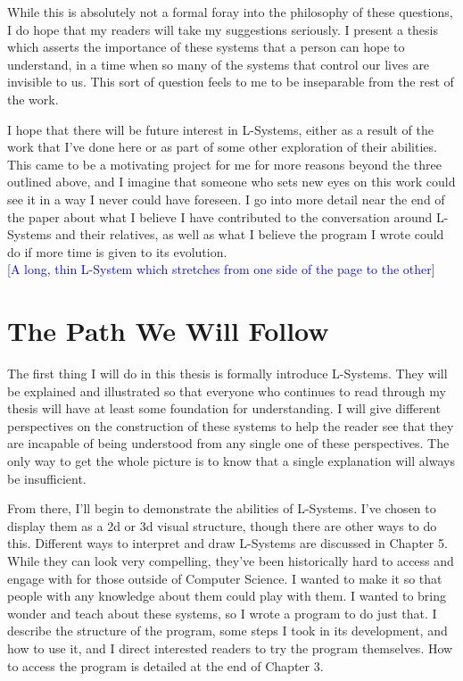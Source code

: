 \documentclass[12pt,twoside]{reedthesis}
\begin{document}
	While this is absolutely not a formal foray into the philosophy of these questions, I do hope that my readers will take my suggestions seriously. I present a thesis which asserts the importance of these systems that a person can hope to understand, in a time when so many of the systems that control our lives are invisible to us. This sort of question feels to me to be inseparable from the rest of the work.
	
	I hope that there will be future interest in L-Systems, either as a result of the work that I’ve done here or as part of some other exploration of their abilities. This came to be a motivating project for me for more reasons beyond the three outlined above, and I imagine that someone who sets new eyes on this work could see it in a way I never could have foreseen. I go into more detail near the end of the paper about what I believe I have contributed to the conversation around L-Systems and their relatives, as well as what I believe the program I wrote could do if more time is given to its evolution.\\
	
	\textcolor{blue}{[A long, thin L-System which stretches from one side of the page to the other]}
	
\section{The Path We Will Follow}

	The first thing I will do in this thesis is formally introduce L-Systems. They will be explained and illustrated so that everyone who continues to read through my thesis will have at least some foundation for understanding. I will give different perspectives on the construction of these systems to help the reader see that they are incapable of being understood from any single one of these perspectives. The only way to get the whole picture is to know that a single explanation will always be insufficient.
	
	From there, I'll begin to demonstrate the abilities of L-Systems. I've chosen to display them as a 2d or 3d visual structure, though there are other ways to do this. Different ways to interpret and draw L-Systems are discussed in Chapter 5. While they can look very compelling, they've been historically hard to access and engage with for those outside of Computer Science. I wanted to make it so that people with any knowledge about them could play with them. I wanted to bring wonder and teach about these systems, so I wrote a program to do just that. I describe the structure of the program, some steps I took in its development, and how to use it, and I direct interested readers to try the program themselves. How to access the program is detailed at the end of Chapter 3.\\
	
\end{document}

